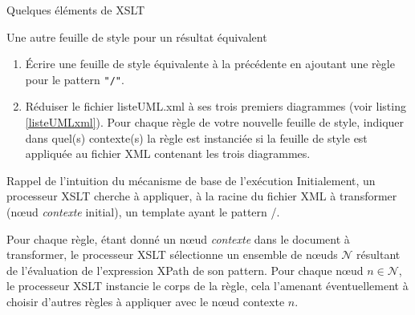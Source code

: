 \begin{frame}{Quelques \'el\'ements de XSLT}
\framebreak

Une autre feuille de style pour un r\'esultat \'equivalent\\

\begin{center}
\begin{minipage}{\textwidth}

\end{minipage}
\end{center}

\begin{small}

\begin{exoblock}
\begin{enumerate}
\item  \'Ecrire une feuille de style \'equivalente \`a la pr\'ec\'edente en ajoutant une règle pour le pattern \texttt{"/"}.
\item Réduiser le fichier listeUML.xml à ses trois premiers diagrammes (voir listing \ref{listeUMLxml}). Pour chaque règle de votre nouvelle feuille de style, indiquer dans quel(s) contexte(s) la règle est instanciée si la feuille de style est appliquée au fichier XML contenant les trois diagrammes.
\end{enumerate}
\end{exoblock}
 
\bigskip 
\begin{block}{Rappel de l'intuition du mécanisme de base de l'exécution}
Initialement, un processeur XSLT cherche à appliquer, à la racine du fichier XML à transformer (n{\oe}ud \textit{contexte} initial), un template ayant le pattern /. 

\medskip

Pour chaque règle, étant donné un n{\oe}ud \textit{contexte} dans le document à transformer, le processeur XSLT sélectionne un ensemble de n{\oe}uds $\mathcal{N}$ résultant de l'évaluation de l'expression XPath de son pattern. Pour chaque n{\oe}ud $n \in \mathcal{N}$, le processeur XSLT instancie le corps de la règle, cela l'amenant éventuellement à choisir d'autres règles à appliquer avec le n{\oe}ud contexte $n$. 
\end{block}
\end{small}



\end{frame}
